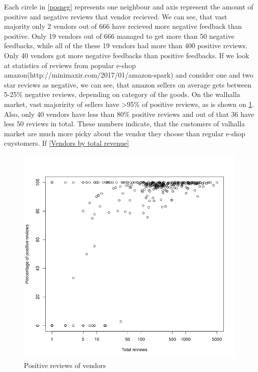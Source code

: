 \documentclass[
  digital, %
  table,   %
  lof,     %
  lot,     %
  oneside
]{fithesis3}
\begin{document}
Each circle in \ref{posneg} represents one neighbour and axis represent
the amount of positive and negative reviews that vendor recieved. 
We can see, that vast majority only 2 vendors out of 666 have recieved more negative feedback than positive.
Only 19 vendors out of 666 managed to get more than 50 negative feedbacks, while all of the these 19 vendors had more
 than 400 positive reviews.
Only 40 vendors got more negative feedbacks than positive feedbacks.
 If we look at statistics of reviews from popular e-shop amazon(http://minimaxir.com/2017/01/amazon-spark)
  and consider one and two star reviews as negative, we can see, that amazon sellers on
  average gets between 5-25\% negative reviews, depending on category of the goods.
  On the walhalla market, vast majoririty of sellers have >95\% of positive reviews, as is shown on \ref{pospercent}.
  Also, only 40 vendors have less than 80\% positive reviews and out of that 36 have less 50 reviews in total.
  These numbers indicate, that the customers of valhalla market are much more picky about the vendor they choose
  than regular e-shop cuystomers. If \ref{Vendors by total revenue}
  

\begin{figure}[!htb]
    \centering
    \includegraphics[scale=0.4]{pospercent}
    \caption{Positive reviews of vendors}
    \label{pospercent}
\end{figure}
\end{document}
